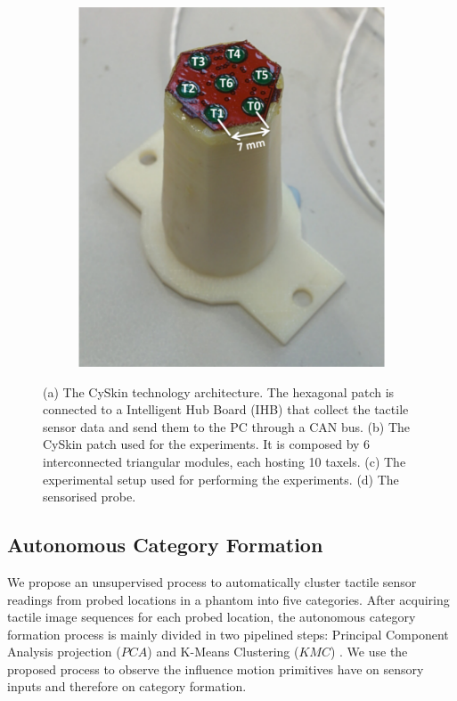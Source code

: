 \documentclass[]{interact}
\theoremstyle{plain}%
\theoremstyle{definition}
\theoremstyle{remark}
\begin{document}
\begin{figure}[]
\begin{subfigure}[b]{0.32\textwidth}
		\includegraphics[width=\textwidth]{./figs/probefreccia.pdf}
		\caption{}
		\label{exp:probe}
	\end{subfigure}
	\caption{(a) The CySkin technology architecture. The hexagonal patch is connected to a Intelligent Hub Board (IHB) that collect the tactile sensor data and send them to the PC through a CAN bus. (b) The CySkin patch used for the experiments. It is composed by 6 interconnected triangular modules, each hosting 10 taxels. (c) The experimental setup used for performing the experiments. (d) The sensorised probe.}
	\label{CySkin}
\end{figure}
\subsection{Autonomous Category Formation}\label{sec_unsup_clustering}


We propose an unsupervised process to automatically cluster tactile sensor readings from probed locations in a phantom into five categories. After acquiring tactile image sequences for each probed location, the autonomous category formation process is mainly divided in two pipelined steps: Principal Component Analysis projection ($PCA$) \cite{tipping_probabilistic_1999} and K-Means Clustering ($KMC$) \cite{lloyd_least_1982}. We use the proposed process to observe the influence motion primitives have on sensory inputs and therefore on category formation.
\end{document}
